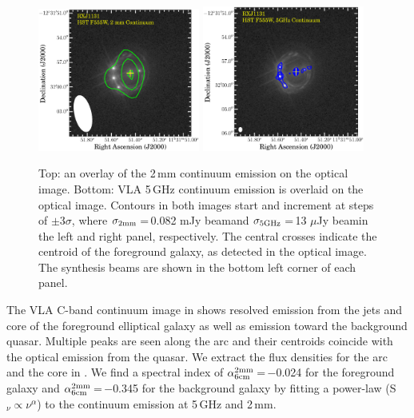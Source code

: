\documentclass[]{emulateapj}
\begin{document}
\begin{figure}[!htbp]
\includegraphics[trim=12 27 0 1, clip, width=0.475\textwidth]{../Figures/F555W_ContPdBI.eps}
\includegraphics[trim=13 5 0 0, clip, width=0.475\textwidth]{../Figures/F555W_ContVLA.eps}
\caption{Top: an overlay of the 2\,mm continuum emission on the optical image.
Bottom: VLA 5\,GHz continuum emission is overlaid on the optical image.
Contours in both images start and increment at steps of
$\pm$3$\sigma$, where $\sigma_{\rm 2mm}$\,=\,0.082 mJy beam\pmOne and
$\sigma_{\rm 5GHz}$\,=\,13 $\mu$Jy beam\pmOne in the left and right panel, respectively.
The central crosses indicate the centroid of the foreground galaxy,
as detected in the optical image. The synthesis beams are shown in the bottom left corner of each panel.
\label{fig:cont}}\vspace{0.51em}
\end{figure}

The VLA C-band continuum image in  shows resolved emission from the
jets and core of the foreground elliptical galaxy
as well as emission toward the background quasar.
Multiple peaks are seen along the arc and their centroids
coincide with the optical emission from the quasar.
We extract the flux densities for the arc and the core in .
We find a spectral index of $\alpha^{\rm 2mm}_{\rm 6cm}$\,=\,$-$0.024
for the foreground
galaxy and $\alpha^{\rm 2mm}_{\rm 6cm}$\,=\,$-$0.345
for the background galaxy by fitting a
power-law (S$_\nu \propto \nu^{\alpha}$) to the continuum emission at
5\,GHz and 2\,mm.
\end{document}
